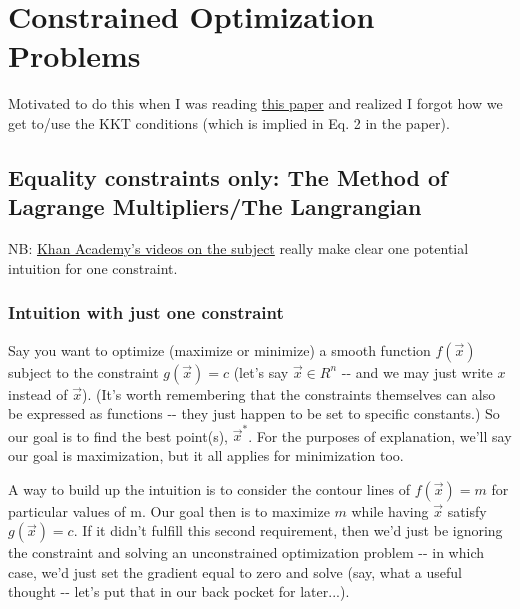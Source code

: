 \documentclass[letterpaper,12pt]{report}
\begin{document}
\newpage

\chapter{Constrained Optimization
Problems}\label{constrained-optimization-problems}

Motivated to do this when I was reading
\href{https://arxiv.org/pdf/1606.05579.pdf}{this paper} and realized I
forgot how we get to/use the KKT conditions (which is implied in Eq. 2
in the paper).

\section{Equality constraints only: The Method of Lagrange
Multipliers/The
Langrangian}\label{equality-constraints-only-the-method-of-lagrange-multipliersthe-langrangian}

NB:
\href{https://www.khanacademy.org/math/multivariable-calculus/applications-of-multivariable-derivatives/lagrange-multipliers-and-constrained-optimization/v/constrained-optimization-introduction}
{Khan
Academy's videos on the subject} really make clear one potential
intuition for one constraint.

\subsection{Intuition with just one
constraint}\label{intuition-with-just-one-constraint}

Say you want to optimize (maximize or minimize) a smooth function
\(f(\vec{x})\) subject to the constraint \(g(\vec{x}) = c\) (let's say
\(\vec{x} \in R^n\) -\/- and we may just write \(x\) instead of
\(\vec{x}\)). (It's worth remembering that the constraints themselves
can also be expressed as functions -\/- they just happen to be set to
specific constants.) So our goal is to find the best point(s),
\({\vec{x}^*}\). For the purposes of explanation, we'll say our goal is
maximization, but it all applies for minimization too.

A way to build up the intuition is to consider the contour lines of
\(f(\vec{x}) = m\) for particular values of m. Our goal then is to
maximize \(m\) while having \(\vec{x}\) satisfy \(g(\vec{x}) = c\). If
it didn't fulfill this second requirement, then we'd just be ignoring
the constraint and solving an unconstrained optimization problem -\/- in
which case, we'd just set the gradient equal to zero and solve (say,
what a useful thought -\/- let's put that in our back pocket for
later...).
\end{document}
